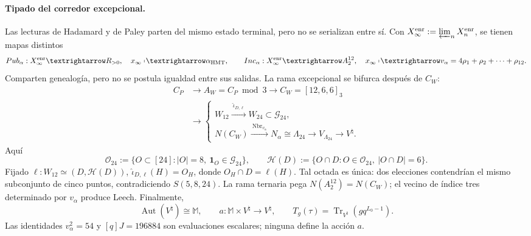\paragraph{Tipado del corredor excepcional.}
Las lecturas de Hadamard y de Paley parten del mismo estado terminal, pero no
se serializan entre sí. Con
\(X_\infty^{\rm enr}:=\varprojlim_nX_n^{\rm enr}\), se tienen mapas distintos
\begin{equation}
 \operatorname{Pub}_\alpha:X_\infty^{\rm enr}\longrightarrow\mathbb R_{>0},
 \quad x_\infty\longmapsto\alpha_{\rm HMT},
 \qquad
 \operatorname{Inc}_\alpha:X_\infty^{\rm enr}\longrightarrow A_2^{12},
 \quad x_\infty\longmapsto
 v_\alpha=4\rho_1+\rho_2+\cdots+\rho_{12}.
 \label{eq:frontal-dos-publicaciones-alpha}
\end{equation}
Comparten genealogía, pero no se postula igualdad entre sus salidas. La rama
excepcional se bifurca después de \(C_W\):
\begin{equation}
 \begin{aligned}
 C_P&\longrightarrow A_W=C_P\bmod3\longrightarrow
 C_W=[12,6,6]_3\\
 &\longrightarrow
 \begin{cases}
 W_{12}\xrightarrow{\ \widehat\iota_{D,\ell}\ }
 W_{24}\subset\mathcal G_{24},\\[2pt]
 N(C_W)\xrightarrow{\ \operatorname{Nbr}_{v_\alpha}\ }
 N_\alpha\cong\Lambda_{24}\longrightarrow
 V_{\Lambda_{24}}\longrightarrow V^\natural .
 \end{cases}
 \end{aligned}
 \label{eq:frontal-cadena-excepcional}
\end{equation}
Aquí
\begin{equation}
 \mathcal O_{24}:=\{O\subset[24]:|O|=8,\ \mathbf1_O\in\mathcal G_{24}\},
 \qquad
 \mathcal H(D):=\{O\cap D:O\in\mathcal O_{24},\ |O\cap D|=6\}.
 \label{eq:frontal-octadas-hexadas-dodecada}
\end{equation}
Fijado \(\ell:W_{12}\simeq(D,\mathcal H(D))\),
\(\widehat\iota_{D,\ell}(H)=O_H\), donde
\(O_H\cap D=\ell(H)\). Tal octada es única: dos elecciones contendrían el
mismo subconjunto de cinco puntos, contradiciendo \(S(5,8,24)\). La rama
ternaria pega \(N(A_2^{12})=N(C_W)\); el vecino de índice tres determinado
por \(v_\alpha\) produce Leech. Finalmente,
\begin{equation}
 \operatorname{Aut}(V^\natural)\cong\mathbb M,\qquad
 a:\mathbb M\times V^\natural\longrightarrow V^\natural,\qquad
 T_g(\tau)=\operatorname{Tr}_{V^\natural}(gq^{L_0-1}).
 \label{eq:frontal-accion-monstruo}
\end{equation}
Las identidades \(v_\alpha^2=54\) y \([q]J=196884\) son evaluaciones
escalares; ninguna define la acción \(a\).

